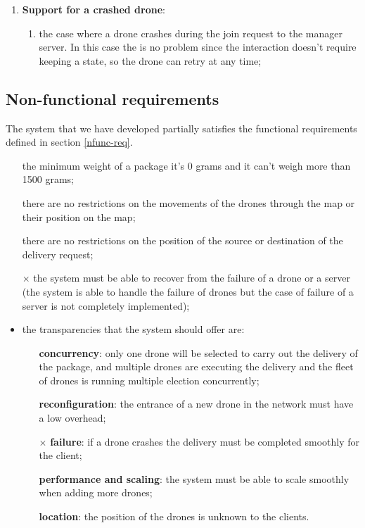 \documentclass[a4paper, oneside]{memoir}
\begin{document}
\begin{enumerate}
\item \textbf{Support for a crashed drone}:
	\begin{enumerate}
		\item the case where a drone crashes during the join request to the manager server. In this case the is no problem since the interaction doesn't require keeping a state, so the drone can retry at any time;
	\end{enumerate}

\end{enumerate}


\subsection{Non-functional requirements}
The system that we have developed partially satisfies the functional requirements defined in section \ref{nfunc-req}.

\begin{itemize}
\item[\checkmark] the minimum weight of a package it's 0 grams and it can't weigh more than 1500 grams;
\item[\checkmark] there are no restrictions on the movements of the drones through the map or their position on the map;
\item[\checkmark] there are no restrictions on the position of the source or destination of the delivery request;
\item[$\times$] the system must be able to recover from the failure of a drone or a server (the system is able to handle the failure of drones but the case of failure of a server is not completely implemented);

\item the transparencies that the system should offer are:
	\begin{itemize}
	\item[\checkmark] \textbf{concurrency}: only one drone will be selected to carry out the delivery of the package, and multiple drones are executing the delivery and the fleet of drones is running multiple election concurrently;
	\item[\checkmark] \textbf{reconfiguration}: the entrance of a new drone in the network must have a low overhead;
	\item[$\times$] \textbf{failure}: if a drone crashes the delivery must be completed smoothly for the client;
	\item[\checkmark] \textbf{performance and scaling}: the system must be able to scale smoothly when adding more drones;
	\item[\checkmark] \textbf{location}: the position of the drones is unknown to the clients.
	\end{itemize}
\end{itemize}
\end{document}

